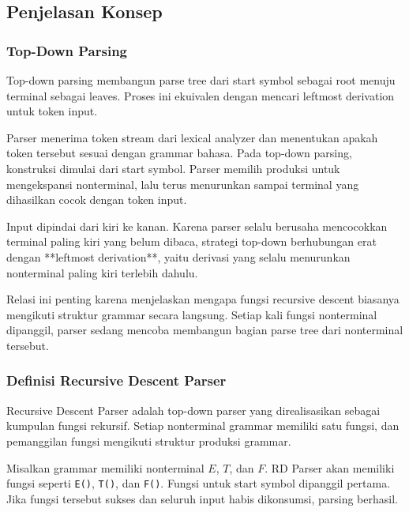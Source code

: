 \subsection{Penjelasan Konsep}

\subsubsection{Top-Down Parsing}

\begin{jawab}
Top-down parsing membangun parse tree dari start symbol sebagai root menuju terminal sebagai leaves. Proses ini ekuivalen dengan mencari leftmost derivation untuk token input.
\end{jawab}

Parser menerima token stream dari lexical analyzer dan menentukan apakah token tersebut sesuai dengan grammar bahasa. Pada top-down parsing, konstruksi dimulai dari start symbol. Parser memilih produksi untuk mengekspansi nonterminal, lalu terus menurunkan sampai terminal yang dihasilkan cocok dengan token input.

Input dipindai dari kiri ke kanan. Karena parser selalu berusaha mencocokkan terminal paling kiri yang belum dibaca, strategi top-down berhubungan erat dengan **leftmost derivation**, yaitu derivasi yang selalu menurunkan nonterminal paling kiri terlebih dahulu.

Relasi ini penting karena menjelaskan mengapa fungsi recursive descent biasanya mengikuti struktur grammar secara langsung. Setiap kali fungsi nonterminal dipanggil, parser sedang mencoba membangun bagian parse tree dari nonterminal tersebut.

\subsubsection{Definisi Recursive Descent Parser}

\begin{jawab}
Recursive Descent Parser adalah top-down parser yang direalisasikan sebagai kumpulan fungsi rekursif. Setiap nonterminal grammar memiliki satu fungsi, dan pemanggilan fungsi mengikuti struktur produksi grammar.
\end{jawab}

Misalkan grammar memiliki nonterminal $E$, $T$, dan $F$. RD Parser akan memiliki fungsi seperti \texttt{E()}, \texttt{T()}, dan \texttt{F()}. Fungsi untuk start symbol dipanggil pertama. Jika fungsi tersebut sukses dan seluruh input habis dikonsumsi, parsing berhasil.

